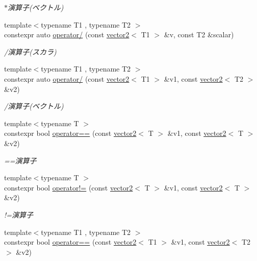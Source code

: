 \begin{DoxyCompactItemize}
\begin{DoxyCompactList}\small\item\em $\ast$演算子(ベクトル) \end{DoxyCompactList}\item 
{\footnotesize template$<$typename T1 , typename T2 $>$ }\\constexpr auto \mbox{\hyperlink{namespacesaki_ab12f7d971656317d7e0502bf64fe762a}{operator/}} (const \mbox{\hyperlink{classsaki_1_1vector2}{vector2}}$<$ T1 $>$ \&v, const T2 \&scalar)
\begin{DoxyCompactList}\small\item\em /演算子(スカラ) \end{DoxyCompactList}\item 
{\footnotesize template$<$typename T1 , typename T2 $>$ }\\constexpr auto \mbox{\hyperlink{namespacesaki_af613b8219c84ed98901c66a082938a61}{operator/}} (const \mbox{\hyperlink{classsaki_1_1vector2}{vector2}}$<$ T1 $>$ \&v1, const \mbox{\hyperlink{classsaki_1_1vector2}{vector2}}$<$ T2 $>$ \&v2)
\begin{DoxyCompactList}\small\item\em /演算子(ベクトル) \end{DoxyCompactList}\item 
{\footnotesize template$<$typename T $>$ }\\constexpr bool \mbox{\hyperlink{namespacesaki_a2aafc5056183a1a522b89497ee3439e9}{operator==}} (const \mbox{\hyperlink{classsaki_1_1vector2}{vector2}}$<$ T $>$ \&v1, const \mbox{\hyperlink{classsaki_1_1vector2}{vector2}}$<$ T $>$ \&v2)
\begin{DoxyCompactList}\small\item\em ==演算子 \end{DoxyCompactList}\item 
{\footnotesize template$<$typename T $>$ }\\constexpr bool \mbox{\hyperlink{namespacesaki_ac0c806d3237b6718e95e9b71f838bcc1}{operator!=}} (const \mbox{\hyperlink{classsaki_1_1vector2}{vector2}}$<$ T $>$ \&v1, const \mbox{\hyperlink{classsaki_1_1vector2}{vector2}}$<$ T $>$ \&v2)
\begin{DoxyCompactList}\small\item\em !=演算子 \end{DoxyCompactList}\item 
{\footnotesize template$<$typename T1 , typename T2 $>$ }\\constexpr bool \mbox{\hyperlink{namespacesaki_a07efea0cf7385fc13c00519e8f0f7732}{operator==}} (const \mbox{\hyperlink{classsaki_1_1vector2}{vector2}}$<$ T1 $>$ \&v1, const \mbox{\hyperlink{classsaki_1_1vector2}{vector2}}$<$ T2 $>$ \&v2)

\end{DoxyCompactItemize}
